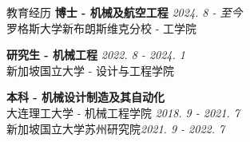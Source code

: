 \documentclass{resume} %
\begin{document}



\begin{rSection}{\fangsong 教育经历}
{\bf {\fangsong 博士 - 机械及航空工程}} \hfill {\em 2024. 8 - 至今}\\ 
{\fangsong 罗格斯大学新布朗斯维克分校 - 工学院}

{\bf {\fangsong 研究生 - 机械工程}} \hfill {\em 2022. 8 - 2024. 1}\\ 
{\fangsong 新加坡国立大学 - 设计与工程学院}

{\bf {\fangsong 本科 - 机械设计制造及其自动化}} \\
{\fangsong 大连理工大学 - 机械工程学院} \hfill {\em {2018. 9 - 2021. 7}}\\
{\fangsong 新加坡国立大学苏州研究院}\hfill {\em 2021. 9 - 2022. 7}\\
\end{rSection}

\vspace{-1em}
\end{document}
